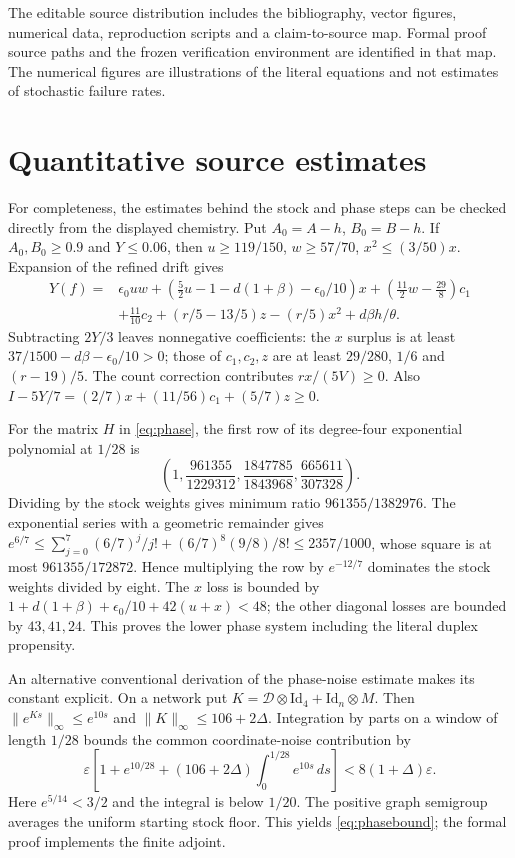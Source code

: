 \documentclass[11pt]{article}
\theoremstyle{definition}\newtheorem{definition}[theorem]{Definition}
\begin{document}
The editable source distribution includes the bibliography, vector figures, numerical
data, reproduction scripts and a claim-to-source map. Formal proof source paths and
the frozen verification environment are identified in that map. The numerical figures
are illustrations of the literal equations and not estimates of stochastic failure rates.

\appendix
\section{Quantitative source estimates}\label{app:estimates}
For completeness, the estimates behind the stock and phase steps can be checked
directly from the displayed chemistry. Put $A_0=A-h$, $B_0=B-h$. If
$A_0,B_0\ge0.9$ and $Y\le0.06$, then
$u\ge119/150$, $w\ge57/70$, $x^2\le(3/50)x$. Expansion of the refined drift gives
\begin{align*}
Y(f)={}&\epsilon_0uw+
 (\tfrac52u-1-d(1+\beta)-\epsilon_0/10)x
 +(\tfrac{11}{2}w-\tfrac{29}{8})c_1\\
&+\tfrac{11}{10}c_2+(r/5-13/5)z-(r/5)x^2+d\beta h/\theta.
\end{align*}
Subtracting $2Y/3$ leaves nonnegative coefficients: the $x$ surplus is at least
$37/1500-d\beta-\epsilon_0/10>0$; those of $c_1,c_2,z$ are at least
$29/280$, $1/6$ and $(r-19)/5$. The count correction contributes $rx/(5V)\ge0$.
Also $I-5Y/7=(2/7)x+(11/56)c_1+(5/7)z\ge0$.

For the matrix $H$ in \eqref{eq:phase}, the first row of its degree-four exponential
polynomial at $1/28$ is
\[
\left(1,\frac{961355}{1229312},\frac{1847785}{1843968},
\frac{665611}{307328}\right).
\]
Dividing by the stock weights gives minimum ratio $961355/1382976$.
The exponential series with a geometric remainder gives
$e^{6/7}\le\sum_{j=0}^7(6/7)^j/j!+(6/7)^8(9/8)/8!\le2357/1000$,
whose square is at most $961355/172872$. Hence multiplying the row by
$e^{-12/7}$ dominates the stock weights divided by eight.
The $x$ loss is bounded by $1+d(1+\beta)+\epsilon_0/10+42(u+x)<48$;
the other diagonal losses are bounded by $43,41,24$. This proves the lower phase
system including the literal duplex propensity.

An alternative conventional derivation of the phase-noise estimate makes its
constant explicit. On a network put $K=\mathcal D\otimes\mathrm{Id}_4+
\mathrm{Id}_n\otimes M$. Then $\|e^{Ks}\|_\infty\le e^{10s}$ and
$\|K\|_\infty\le106+2\Delta$. Integration by parts on a window of length
$1/28$ bounds the common coordinate-noise contribution by
\[
\varepsilon\left[1+e^{10/28}+(106+2\Delta)\int_0^{1/28}e^{10s}\,ds\right]
<8(1+\Delta)\varepsilon.
\]
Here $e^{5/14}<3/2$ and the integral is below $1/20$.
The positive graph semigroup averages the uniform starting stock floor.
This yields \eqref{eq:phasebound}; the formal proof implements the finite adjoint.
\end{document}

